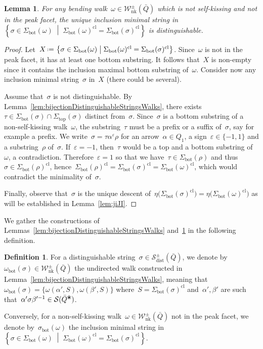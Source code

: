 \documentclass{amsart}
\newtheorem{lemma}[theorem]{Lemma}
\theoremstyle{definition}
\newtheorem{definition}[theorem]{Definition}
\newcommand{\set}[2]{\left\{ #1 \;\middle|\; #2 \right\}} %
\newcommand{\eqdef}{\mbox{\,\raisebox{0.2ex}{\scriptsize\ensuremath{\mathrm:}}\ensuremath{=}\,}} %
\newcommand{\blossom}{^\text{\ding{96}}} %
\newcommand{\strings}{\mathcal{S}} %
\newcommand{\distinguishableStrings}{\mathcal{S}_\mathrm{dist}} %
\newcommand{\NKWalks}{\mathcal{W}_\mathrm{nk}} %
\renewcommand{\top}{\mathrm{top}} %
\newcommand{\bottom}{\mathrm{bot}} %
\newcommand{\closure}[1]{#1^{\mathrm{cl}}} %
\begin{document}
\begin{lemma}
\label{lem:bijectionWalksDistinguishableStrings}
For any bending walk~$\omega \in \NKWalks^\pm(\bar Q)$ which is not self-kissing and not in the peak facet, the unique inclusion minimal string in~$\set{\sigma \in \Sigma_\bottom(\omega)}{\closure{\Sigma_\bottom(\omega)} = \closure{\Sigma_\bottom(\sigma)}}$ is distinguishable.
\end{lemma}

\begin{proof}
Let~$X \eqdef \set{\sigma \in \Sigma_\bottom(\omega)}{\closure{\Sigma_\bottom(\omega)} = \closure{\Sigma_\bottom(\sigma)}}$.
Since~$\omega$ is not in the peak facet, it has at least one bottom substring.
It follows that~$X$ is non-empty since it contains the inclusion maximal bottom substring of~$\omega$.
Consider now any inclusion minimal string~$\sigma$ in~$X$ (there could be several).

Assume that~$\sigma$ is not distinguishable.
By Lemma~\ref{lem:bijectionDistinguishableStringsWalks}, there exists~${\tau \in \Sigma_\bottom(\sigma) \cap \Sigma_\top(\sigma)}$ distinct from~$\sigma$.
Since~$\sigma$ is a bottom substring of a non-self-kissing walk~$\omega$, the substring~$\tau$ must be a prefix or a suffix of~$\sigma$, say for example a prefix.
We write~$\sigma = \tau \alpha^\varepsilon \rho$ for an arrow~$\alpha \in Q_1$, a sign~$\varepsilon \in \{-1,1\}$ and a substring~$\rho$ of~$\sigma$.
If~$\varepsilon = -1$, then~$\tau$ would be a top and a bottom substring of~$\omega$, a contradiction.
Therefore~$\varepsilon = 1$ so that we have~$\tau \in \Sigma_\bottom(\rho)$ and thus~$\sigma \in \closure{\Sigma_\bottom(\rho)}$, hence~$\closure{\Sigma_\bottom(\rho)} = \closure{\Sigma_\bottom(\sigma)} = \closure{\Sigma_\bottom(\omega)}$, which would contradict the minimality of~$\sigma$.

Finally, observe that~$\sigma$ is the unique descent of~$\eta \big( \closure{\Sigma_\bottom(\sigma)} \big) = \eta \big( \closure{\Sigma_\bottom(\omega)} \big)$ as will be established in Lemma~\ref{lem:jiJI}.
\end{proof}

We gather the constructions of Lemmas~\ref{lem:bijectionDistinguishableStringsWalks} and~\ref{lem:bijectionWalksDistinguishableStrings} in the following definition.

\begin{definition}
\label{def:bijectionWalksDistinguishableStrings}
For a distinguishable string~$\sigma \in \distinguishableStrings^\pm(\bar Q)$, we denote by $\omega_\bottom(\sigma) \in \NKWalks^\pm(\bar Q)$ the undirected walk constructed in Lemma~\ref{lem:bijectionDistinguishableStringsWalks}, meaning that~$\omega_\bottom(\sigma) = \{\omega(\alpha',S), \omega(\beta',S)\}$ where~$S = \closure{\Sigma_\bottom(\sigma)}$ and~$\alpha', \beta'$ are such that~$\alpha'\sigma\beta'^{-1} \in \strings(\bar Q\blossom)$.

Conversely, for a non-self-kissing walk~$\omega \in \NKWalks^\pm(\bar Q)$ not in the peak facet, we denote by~$\sigma_\bottom(\omega)$ the inclusion minimal string in~$\set{\sigma \in \Sigma_\bottom(\omega)}{\closure{\Sigma_\bottom(\omega)} = \closure{\Sigma_\bottom(\sigma)}}$.
\end{definition}
\end{document}
